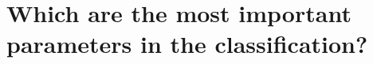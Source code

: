 \documentclass[10pt]{article}
\begin{document}
\section{Which are the most important parameters in the classification?}







\end{document}
